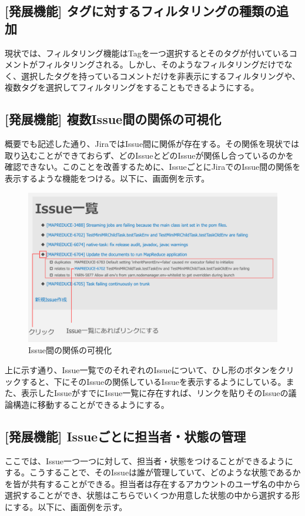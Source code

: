 \documentclass[12pt, oneside]{jreport}
\begin{document}
		\subsection{[発展機能] タグに対するフィルタリングの種類の追加}
		現状では、フィルタリング機能はTagを一つ選択するとそのタグが付いているコメントがフィルタリングされる。しかし、そのようなフィルタリングだけでなく、選択したタグを持っているコメントだけを非表示にするフィルタリングや、複数タグを選択してフィルタリングをすることもできるようにする。

		\subsection{[発展機能] 複数Issue間の関係の可視化}
		概要でも記述した通り、JiraではIssue間に関係が存在する。その関係を現状では取り込むことができておらず、どのIssueとどのIssueが関係し合っているのかを確認できない。このことを改善するために、IssueごとにJiraでのIssue間の関係を表示するような機能をつける。以下に、画面例を示す。
		
		\begin{figure}[H]
		\centering
		\includegraphics[width=17cm,bb=300 300 -200 27]{RelatesVisualize.png}
		\caption{Issue間の関係の可視化}
		\end{figure}
		
		上に示す通り、Issue一覧でのそれぞれのIssueについて、ひし形のボタンをクリックすると、下にそのIssueの関係しているIssueを表示するようにしている。また、表示したIssueがすでにIssue一覧に存在すれば、リンクを貼りそのIssueの議論構造に移動することができるようにする。

		\subsection{[発展機能] Issueごとに担当者・状態の管理}
		ここでは、Issue一つ一つに対して、担当者・状態をつけることができるようにする。こうすることで、そのIssueは誰が管理していて、どのような状態であるかを皆が共有することができる。担当者は存在するアカウントのユーザ名の中から選択することができ、状態はこちらでいくつか用意した状態の中から選択する形にする。以下に、画面例を示す。
		
\end{document}
